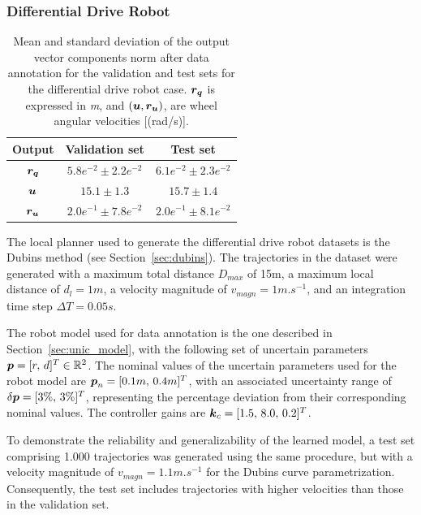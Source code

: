 \subsubsection{Differential Drive Robot}\label{sec:dataset_unic}

\begin{table}[t]
    \centering
    \begin{tabular}{ | c | c || c |}
    \hline
      \textbf{Output}  & \textbf{Validation set}  & \textbf{Test set} \\ \hline
    $\boldsymbol{r_q}$ & $5.8e^{-2} \pm 2.2e^{-2}$ & $6.1e^{-2} \pm 2.3e^{-2}$ \\ \hline
    $\boldsymbol{u}$ & $15.1 \pm 1.3$ & $15.7 \pm 1.4$ \\ \hline
    $\boldsymbol{r_u}$ & $2.0e^{-1} \pm 7.8e^{-2}$ & $2.0e^{-1} \pm 8.1e^{-2}$ \\ \hline
\end{tabular}
\caption{
Mean and standard deviation of the output vector components norm after data annotation for the validation and test sets for the differential drive robot case.
$\boldsymbol{r_q}$ is expressed in \emph{m}, and $(\boldsymbol{u}, \boldsymbol{r_u})$, are wheel angular velocities [(rad/s)].}
 \label{tab:datas_stats_unic}
\end{table}

The local planner used to generate the differential drive robot datasets is the Dubins method (see Section~\ref{sec:dubins}).
The trajectories in the dataset were generated with a maximum total distance $D_{max}$ of 15m, a maximum local distance of $d_l = 1m$, a velocity magnitude of $v_{magn} = 1 m.s^{-1}$, and an integration time step $\Delta T = 0.05s$. 

The robot model used for data annotation is the one described in Section~\ref{sec:unic_model}, with the following set of uncertain parameters $\boldsymbol{p} = [r, \, d]^T \in \mathbb{R}^{2}$.
The nominal values of the uncertain parameters used for the robot model are  $\boldsymbol{p}_n = [0.1m, \, 0.4m]^T$, with an associated uncertainty range of $\delta\boldsymbol{p} = [3\%, \, 3\%]^T$, representing the percentage deviation from their corresponding nominal values.
The controller gains are $\boldsymbol{k}_c = [1.5, \, 8.0, \, 0.2]^T$.

To demonstrate the reliability and generalizability of the learned model, a test set comprising 1.000 trajectories was generated using the same procedure, but with a velocity magnitude of $v_{magn} = 1.1 m.s^{-1}$ for the Dubins curve parametrization. 
Consequently, the test set includes trajectories with higher velocities than those in the validation set.

